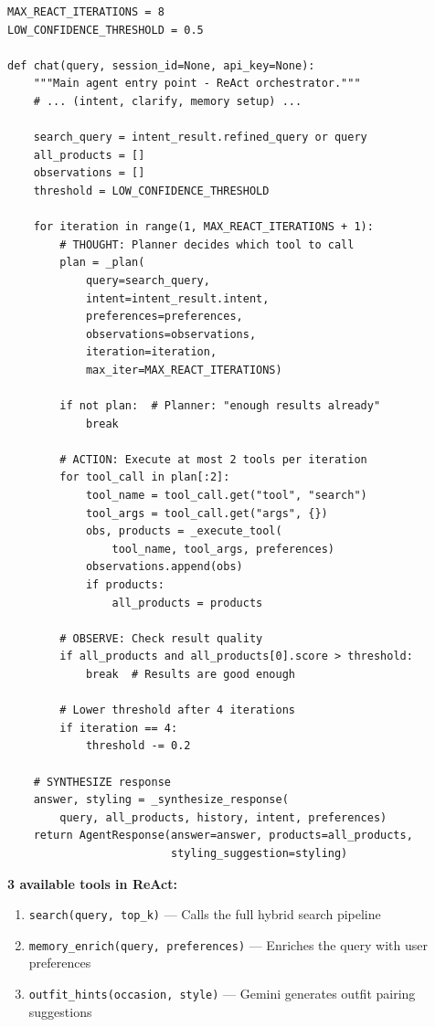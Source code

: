\documentclass[12pt, twoside]{report}
\begin{document}
\begin{lstlisting}[caption={ReAct Loop --- agent/fashion\_agent.py}]
MAX_REACT_ITERATIONS = 8
LOW_CONFIDENCE_THRESHOLD = 0.5

def chat(query, session_id=None, api_key=None):
    """Main agent entry point - ReAct orchestrator."""
    # ... (intent, clarify, memory setup) ...

    search_query = intent_result.refined_query or query
    all_products = []
    observations = []
    threshold = LOW_CONFIDENCE_THRESHOLD

    for iteration in range(1, MAX_REACT_ITERATIONS + 1):
        # THOUGHT: Planner decides which tool to call
        plan = _plan(
            query=search_query,
            intent=intent_result.intent,
            preferences=preferences,
            observations=observations,
            iteration=iteration,
            max_iter=MAX_REACT_ITERATIONS)

        if not plan:  # Planner: "enough results already"
            break

        # ACTION: Execute at most 2 tools per iteration
        for tool_call in plan[:2]:
            tool_name = tool_call.get("tool", "search")
            tool_args = tool_call.get("args", {})
            obs, products = _execute_tool(
                tool_name, tool_args, preferences)
            observations.append(obs)
            if products:
                all_products = products

        # OBSERVE: Check result quality
        if all_products and all_products[0].score > threshold:
            break  # Results are good enough

        # Lower threshold after 4 iterations
        if iteration == 4:
            threshold -= 0.2

    # SYNTHESIZE response
    answer, styling = _synthesize_response(
        query, all_products, history, intent, preferences)
    return AgentResponse(answer=answer, products=all_products,
                         styling_suggestion=styling)
\end{lstlisting}

\textbf{3 available tools in ReAct:}
\begin{enumerate}
    \item \texttt{search(query, top\_k)} --- Calls the full hybrid search pipeline
    \item \texttt{memory\_enrich(query, preferences)} --- Enriches the query with user preferences
    \item \texttt{outfit\_hints(occasion, style)} --- Gemini generates outfit pairing suggestions
\end{enumerate}
\end{document}
